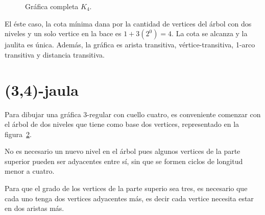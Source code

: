 \documentclass[11pt]{book}
\theoremstyle{definition}
\begin{document}
\begin{figure}[htb]
  \centering
  \caption{Gráfica completa $K_4$.} \label{K_4}
\end{figure}

El éste caso, la cota mínima dana por la cantidad de vertices del
árbol con dos niveles y un solo vertice en la bace es
$1+3(2^{0})=4$. La cota se alcanza y la jaulita es
única. Además, la gráfica es arista transitiva, vértice-transitiva,
1-arco transitiva y distancia transitiva.


\section{(3,4)-jaula}

Para dibujar una gráfica $3$-regular con cuello cuatro, es
conveniente comenzar con el árbol de dos niveles que tiene como base
dos vertices, representado en la figura~\ref{arbol(3,4)}.

\begin{figure}
  \centering
  \caption{} \label{arbol(3,4)}
\end{figure}

No es necesario un nuevo nivel en el árbol pues algunos vertices de la
parte superior pueden ser adyacentes entre sí, sin que se formen
ciclos de longitud menor a cuatro.

Para que el grado de los  vertices de la parte superio sea tres, es
necesario que cada uno tenga dos vertices adyacentes más, es decir
cada vertice necesita estar en dos aristas más. 


\begin{figure}[htb]
  \centering
  \caption{} \label{primarist(3,4)}
\end{figure}
\end{document}

